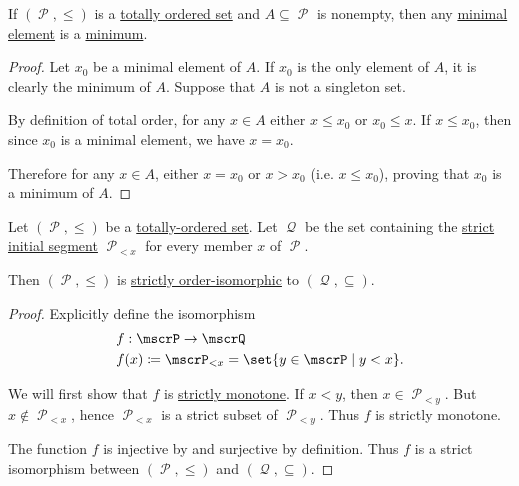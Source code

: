 \begin{proposition}\label{thm:totally_ordered_minimal_element_is_minimum}
  If \( (\mscrP, \leq) \) is a \hyperref[def:totally_ordered_set]{totally ordered set} and \( A \subseteq \mscrP \) is nonempty, then any \hyperref[def:partially_ordered_set_extremal_points/maximal_and_minimal_element]{minimal element} is a \hyperref[def:partially_ordered_set_extremal_points/maximum_and_minimum]{minimum}.
\end{proposition}
\begin{proof}
  Let \( x_0 \) be a minimal element of \( A \). If \( x_0 \) is the only element of \( A \), it is clearly the minimum of \( A \). Suppose that \( A \) is not a singleton set.

  By definition of total order, for any \( x \in A \) either \( x \leq x_0 \) or \( x_0 \leq x \). If \( x \leq x_0 \), then since \( x_0 \) is a minimal element, we have \( x = x_0 \).

  Therefore for any \( x \in A \), either \( x = x_0 \) or \( x > x_0 \) (i.e. \( x \leq x_0 \)), proving that \( x_0 \) is a minimum of \( A \).
\end{proof}

\begin{proposition}\label{thm:totally_ordered_segment_isomorphism}
  Let \( (\mscrP, \leq) \) be a \hyperref[def:totally_ordered_set]{totally-ordered set}. Let \( \mscrQ \) be the set containing the \hyperref[def:partially_ordered_set_interval/ray]{strict initial segment} \( \mscrP_{<x} \) for every member \( x \) of \( \mscrP \).

  Then \( (\mscrP, \leq) \) is \hyperref[def:partially_ordered_set/homomorphism]{strictly order-isomorphic} to \( (\mscrQ, \subseteq) \).
\end{proposition}
\begin{proof}
  Explicitly define the isomorphism
  \begin{equation*}
    \begin{aligned}
      &f: \mscrP \to \mscrQ \\
      &f(x) \coloneqq \mscrP_{<x} = \set{ y \in \mscrP \given y < x }.
    \end{aligned}
  \end{equation*}

  We will first show that \( f \) is \hyperref[def:partially_ordered_set/homomorphism]{strictly monotone}. If \( x < y \), then \( x \in \mscrP_{<y} \). But \( x \not\in \mscrP_{<x} \), hence \( \mscrP_{<x} \) is a strict subset of \( \mscrP_{<y} \). Thus \( f \) is strictly monotone.

  The function \( f \) is injective by  and surjective by definition. Thus \( f \) is a strict isomorphism between \( (\mscrP, \leq) \) and \( (\mscrQ, \subseteq) \).
\end{proof}

